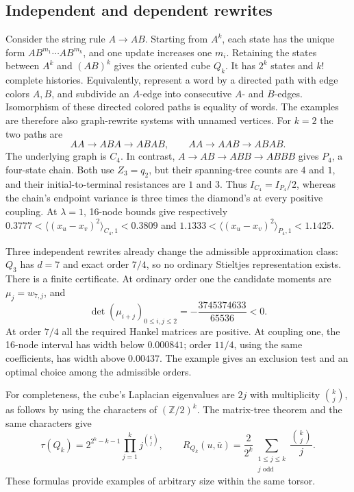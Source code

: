 \documentclass[11pt]{article}
\theoremstyle{definition}
\numberwithin{equation}{section}
\begin{document}
\subsection*{Independent and dependent rewrites}
Consider the string rule $A\to AB$. Starting from $A^k$, each state
has the unique form $AB^{m_1}\cdots AB^{m_k}$, and one update increases
one $m_i$. Retaining the states between $A^k$ and $(AB)^k$ gives the
oriented cube $Q_k$. It has $2^k$ states and $k!$ complete histories.
Equivalently, represent a word by a directed path with edge colors
$A,B$, and subdivide an $A$-edge into consecutive $A$- and $B$-edges.
Isomorphism of these directed colored paths is equality of words.
The examples are therefore also graph-rewrite systems with unnamed vertices.
For $k=2$ the two paths are
\[
 AA\longrightarrow ABA\longrightarrow ABAB,
 \qquad
 AA\longrightarrow AAB\longrightarrow ABAB.
\]
The underlying graph is $C_4$. In contrast,
$A\to AB\to ABB\to ABBB$ gives $P_4$, a four-state chain.
Both use $Z_3=q_2$, but their spanning-tree counts are $4$ and $1$,
and their initial-to-terminal resistances are $1$ and $3$.
Thus $I_{C_4}=I_{P_4}/2$, whereas the chain's endpoint variance is
three times the diamond's at every positive coupling. At $\lambda=1$,
16-node bounds give respectively
$0.3777<\langle(x_u-x_v)^2\rangle_{C_4,1}<0.3809$ and
$1.1333<\langle(x_u-x_v)^2\rangle_{P_4,1}<1.1425$.

Three independent rewrites already change the admissible approximation
class: $Q_3$ has $d=7$ and exact order $7/4$, so no ordinary Stieltjes
representation exists. There is a finite certificate. At ordinary
order one the candidate moments are $\mu_j=w_{7,j}$, and
\[
 \det(\mu_{i+j})_{0\le i,j\le2}
 =-\frac{3745374633}{65536}<0.
\]
At order $7/4$ all the required Hankel matrices are positive.
At coupling one, the 16-node interval has width below $0.000841$;
order $11/4$, using the same coefficients, has width above $0.00437$.
The example gives an exclusion test and an optimal choice among the
admissible orders.

For completeness, the cube's Laplacian eigenvalues are $2j$ with
multiplicity $\binom{k}{j}$, as follows by using the characters of
$(\mathbb Z/2)^k$. The matrix-tree theorem and the same characters give
\[
 \tau(Q_k)=2^{2^k-k-1}\prod_{j=1}^k j^{\binom{k}{j}},\qquad
 R_{Q_k}(u,\bar u)=\frac2{2^k}
       \sum_{\substack{1\le j\le k\\j\text{ odd}}}
          \frac{\binom{k}{j}}j.
\]
These formulas provide examples of arbitrary size within the same torsor.
\end{document}
